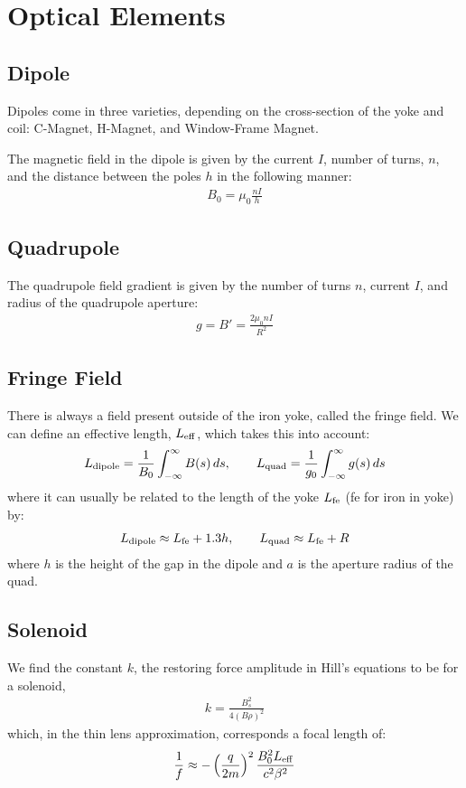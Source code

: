 \documentclass{article}
\numberwithin{equation}{section}
\begin{document}
\section{Optical Elements}

\subsection{Dipole}
Dipoles come in three varieties, depending on the cross-section of the yoke and coil: C-Magnet, H-Magnet, and Window-Frame Magnet.

The magnetic field in the dipole is given by the current $I$, number of turns, $n$, and the distance between the poles $h$ in the following manner:
\begin{align}
B_0 = \mu_0 \frac{nI}{h}
\end{align}

\subsection{Quadrupole}

The quadrupole field gradient is given by the number of turns $n$, current $I$, and radius of the quadrupole aperture:
\begin{align}
g = B' = \frac{2 \mu_0 n I}{R^2}
\end{align}

\subsection{Fringe Field}

There is always a field present outside of the iron yoke, called the fringe field. We can define an effective length, $L_{\rm eff}$, which takes this into account:
\begin{align}
L_{\rm dipole} = \frac{1}{B_0} \int_{-\infty}^{\infty} B(s) \, ds ,\qquad
L_{\rm quad} = \frac{1}{g_0} \int_{-\infty}^{\infty} g(s) \, ds
\end{align}
where it can usually be related to the length of the yoke $L_{\rm fe}$ (fe for iron in yoke) by:
\begin{align}
L_{\rm dipole} \approx L_{\rm fe} + 1.3 h ,\qquad
L_{\rm quad} \approx L_{\rm fe} + R
\end{align}
where $h$ is the height of the gap in the dipole and $a$ is the aperture radius of the quad.

\subsection{Solenoid}
We find the constant $k$, the restoring force amplitude in Hill's equations to be for a solenoid, 
\begin{align}
k = \frac{B_s^2}{4(B \rho)^2}
\end{align}
which, in the thin lens approximation, corresponds a focal length of:
\begin{align}
\frac{1}{f} \approx -\left( \frac{q}{2m} \right)^2 \frac{B_0^2 L_{\rm eff}}{c^2 \beta^2}
\end{align}
\end{document}
